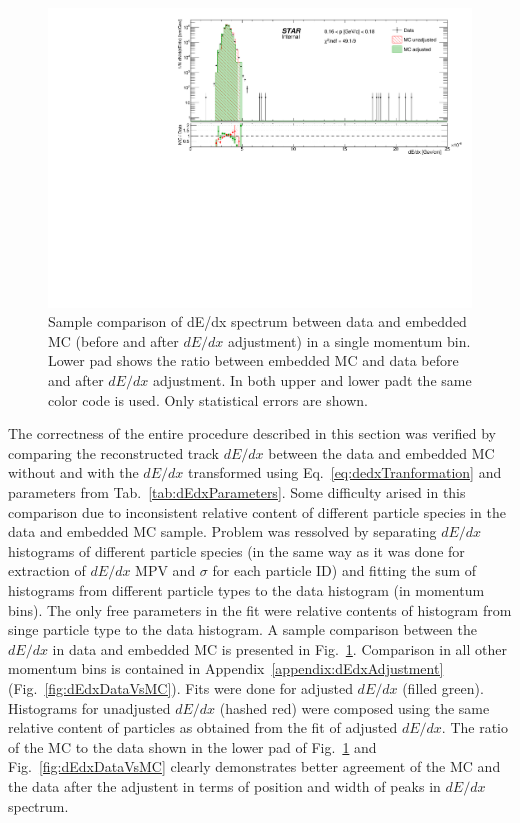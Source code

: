 %
%
\begin{figure}[hb!]\vspace{-5pt}%
\centering%
\includegraphics[width=\linewidth,page=13]{graphics/dedx/dEdx_DataVsMC.pdf}\vspace{-5pt}%
\caption[Sample comparison of dE/dx spectrum between data and embedded MC in single momentum bin.]{Sample comparison of dE/dx spectrum between data and embedded MC (before and after $dE/dx$ adjustment) in a single momentum bin. Lower pad shows the ratio between embedded MC and data before and after $dE/dx$ adjustment. In both upper and lower padt the same color code is used. Only statistical errors are shown.}\label{fig:dEdxDataVsMCSingleBin}
\end{figure}
%
The correctness of the entire procedure described in this section was verified by comparing the reconstructed track $dE/dx$ between the data and embedded MC without and with the $dE/dx$ transformed using Eq.~\eqref{eq:dedxTranformation} and parameters from Tab.~\ref{tab:dEdxParameters}. Some difficulty arised in this comparison due to inconsistent relative content of different particle species in the data and embedded MC sample. Problem was ressolved by separating $dE/dx$ histograms of different particle species (in the same way as it was done for extraction of $dE/dx$ MPV and $\sigma$ for each particle ID) and fitting the sum of histograms from different particle types to the data histogram (in momentum bins). The only free parameters in the fit were relative contents of histogram from singe particle type to the data histogram. A sample comparison between the $dE/dx$ in data and embedded MC is presented in Fig.~\ref{fig:dEdxDataVsMCSingleBin}. Comparison in all other momentum bins is contained in Appendix~\ref{appendix:dEdxAdjustment} (Fig.~\ref{fig:dEdxDataVsMC}). Fits were done for adjusted $dE/dx$ (filled green). Histograms for unadjusted $dE/dx$ (hashed red) were composed using the same relative content of particles as obtained from the fit of adjusted $dE/dx$. The ratio of the MC to the data shown in the lower pad of Fig.~\ref{fig:dEdxDataVsMCSingleBin} and Fig.~\ref{fig:dEdxDataVsMC} clearly demonstrates better agreement of the MC and the data after the adjustent in terms of position and width of peaks in $dE/dx$ spectrum.